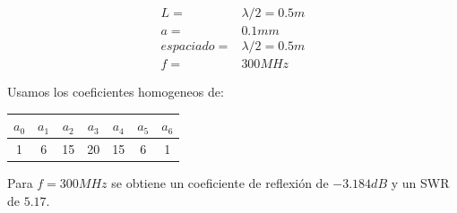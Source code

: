 \documentclass[11pt]{book}
\begin{document}
\begin{align*}
	L = &\lambda/2 =  0.5m \\
	a = & 0.1mm \\
	espaciado = & \lambda / 2 = 0.5m \\
	f = & 300MHz
\end{align*}

Usamos los coeficientes homogeneos de:

\begin{tabular}{c|c|c|c|c|c|c}
	$a_0$ & $a_1$ & $a_2$ & $a_3$ & $a_4$ & $a_5$ & $a_6$ \\ \hline
	1 & 6 & 15 & 20 & 15 & 6 & 1 \\
\end{tabular}

Para $f=300MHz$ se obtiene un coeficiente de reflexión de $-3.184dB$ y un SWR de $5.17$. 
\end{document}
